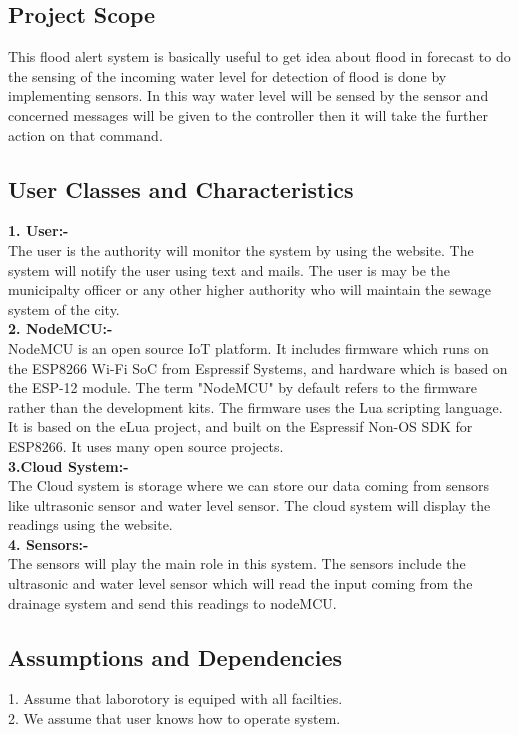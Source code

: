 \documentclass[a4paper,12pt]{report}
\begin{document}
\subsection{Project Scope}
This flood alert system is basically useful to get idea about flood in forecast to do the sensing of the incoming water level for detection of flood is done by implementing sensors. In this way water level will be sensed by the sensor and concerned messages will be given to the controller then it will take the further action on that command.





\subsection{User Classes and Characteristics}
\textbf{1. User:- }\\The user is the authority will monitor the system by using the website. The system will notify the user using text and mails. The user is may be the municipalty officer or any other higher authority who will maintain the sewage system of the city. \\ 
\textbf{2. NodeMCU:-}\\ NodeMCU is an open source IoT platform. It includes firmware which runs on the ESP8266 Wi-Fi SoC from Espressif Systems, and hardware which is based on the ESP-12 module. The term "NodeMCU" by default refers to the firmware rather than the development kits. The firmware uses the Lua scripting language. It is based on the eLua project, and built on the Espressif Non-OS SDK for ESP8266. It uses many open source projects. \\\newline
\textbf{3.Cloud System:-}\\ The Cloud system is storage where we can store our data coming from sensors like ultrasonic sensor and water level sensor. The cloud system will display the readings using the website. \\\newline
\textbf{4. Sensors:-}\\ The sensors will play the main role in this system. The sensors include the ultrasonic and water level sensor which will read the input coming from the drainage system and send this readings to nodeMCU.  

\subsection{Assumptions and Dependencies}
1. Assume that laborotory is equiped with all facilties. \\
2. We assume that user knows how to operate system. \\
\end{document}
